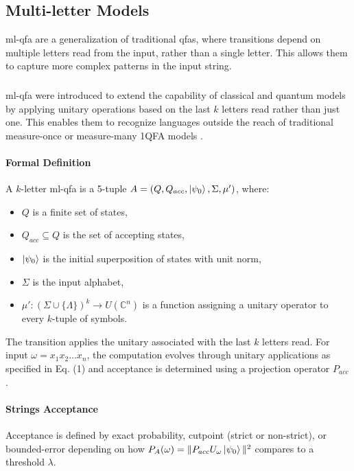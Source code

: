 \subsection{Multi-letter Models}
\label{sec:multi-letter-qfa}

\gls{ml-qfa} are a generalization of traditional \glspl{qfa}, where transitions depend on multiple letters read from the input, rather than a single letter. This allows them to capture more complex patterns in the input string.

\subsubsection{}

\gls{ml-qfa} were introduced to extend the capability of classical and quantum models by applying unitary operations based on the last $k$ letters read rather than just one. This enables them to recognize languages outside the reach of traditional measure-once or measure-many 1QFA models \cite{belovs2007multi}.

\paragraph{Formal Definition}
A $k$-letter \gls{ml-qfa} is a 5-tuple $A = (Q, Q_{acc}, \ket{\psi_0}, \Sigma, \mu')$, where:
\begin{itemize}
    \item $Q$ is a finite set of states,
    \item $Q_{acc} \subseteq Q$ is the set of accepting states,
    \item $\ket{\psi_0}$ is the initial superposition of states with unit norm,
    \item $\Sigma$ is the input alphabet,
    \item $\mu': (\Sigma \cup \{\Lambda\})^k \to U(\mathbb{C}^n)$ is a function assigning a unitary operator to every $k$-tuple of symbols.
\end{itemize}
The transition applies the unitary associated with the last $k$ letters read. For input $\omega = x_1 x_2 \dots x_n$, the computation evolves through unitary applications as specified in Eq. (1) and acceptance is determined using a projection operator $P_{acc}$ \cite{qiu2009hierarchy}.

\paragraph{Strings Acceptance}
Acceptance is defined by exact probability, cutpoint (strict or non-strict), or bounded-error depending on how $P_A(\omega) = \| P_{acc} U_\omega \ket{\psi_0} \|^2$ compares to a threshold $\lambda$.

